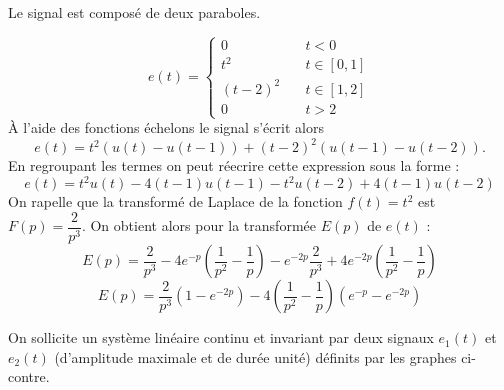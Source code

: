 \question{}
Le signal est composé de deux paraboles. 
\begin{figure}[!h]
    \centering
    
\end{figure}
\[
e(t)=
\begin{cases}
    0&\quad t<0\\
    t^2&\quad t\in[0,1]\\
    (t-2)^2&\quad t\in[1,2]\\
    0&\quad t>2
\end{cases}
\]
\`A l'aide des fonctions échelons le signal s'écrit alors 
\[
    e(t)=t^2\left(u(t)-u(t-1)\right)+(t-2)^2\left(u(t-1)-u(t-2)\right).
\]
En regroupant les termes on peut réecrire cette expression sous la forme :
\[
    e(t)=t^2u(t)-4(t-1)u(t-1)-t^2u(t-2)+4(t-1)u(t-2)
\]
\question{}
On rapelle que la transformé de Laplace de la fonction $f(t)=t^2$ 
est $F(p)=\dfrac{2}{p^3}$. On obtient alors pour la transformée 
$E(p)$ de $e(t)$ :
\[
    E(p)=\dfrac{2}{p^3}-4e^{-p}\left(\dfrac{1}{p^2}-\dfrac{1}{p}\right)
        -e^{-2p}\dfrac{2}{p^3}+4e^{-2p}\left(\dfrac{1}{p^2}-\dfrac{1}{p}\right)
\]
\[
    E(p)=\dfrac{2}{p^3}\left(1-e^{-2p}\right)
        -4\left(\dfrac{1}{p^2}-\dfrac{1}{p}\right)\left(e^{-p}-e^{-2p}\right)
\]


On sollicite un système linéaire continu et invariant par deux signaux $e_1(t)$ 
et $e_2(t)$ (d'amplitude maximale et de durée unité) définits 
par les graphes ci-contre.

